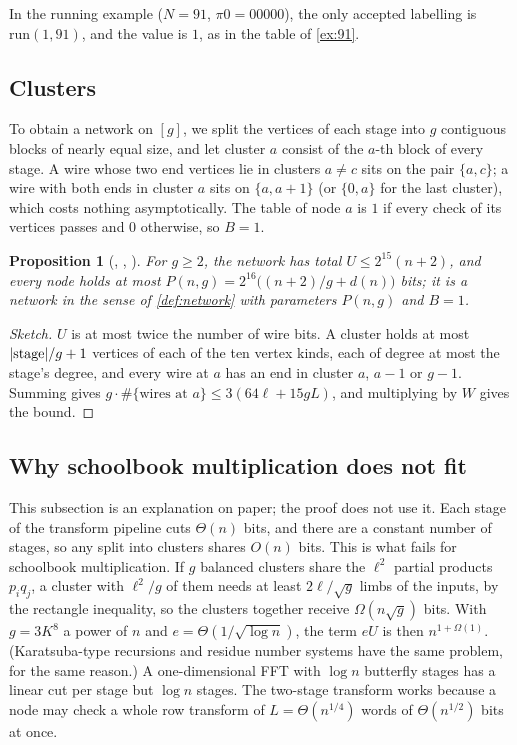 \documentclass[10pt]{amsart}
\theoremstyle{plain}
\newtheorem{proposition}[theorem]{Proposition}
\theoremstyle{definition}
\theoremstyle{remark}
\numberwithin{equation}{section}
\begin{document}
\noindent In the running example ($N=91$, $\pi0=00000$), the only accepted labelling is
$\mathrm{run}(1,91)$, and the value is $1$, as in the table of \cref{ex:91}.

\subsection{Clusters}
To obtain a network on $[g]$, we split the vertices of each stage into $g$ contiguous blocks of nearly
equal size, and let cluster $a$ consist of the $a$-th block of every stage. A wire whose two end
vertices lie in clusters $a\ne c$ sits on the pair $\{a,c\}$; a wire with both ends in cluster $a$ sits
on $\{a,a+1\}$ (or $\{0,a\}$ for the last cluster), which costs nothing asymptotically. The table of node $a$ is $1$ if
every check of its vertices passes and $0$ otherwise, so $B=1$.

\begin{proposition}[, , ]\label{prop:params}
For $g\ge2$, the network has total $U\le2^{15}(n+2)$, and every node holds at most
$P(n,g)=2^{16}\bigl((n+2)/g+d(n)\bigr)$ bits; it is a network in the sense of \cref{def:network} with
parameters $P(n,g)$ and $B=1$.
\end{proposition}

\begin{proof}[Sketch]
$U$ is at most twice the number of wire bits. A cluster holds at most $|{\rm stage}|/g+1$ vertices of each
of the ten vertex kinds, each of degree at most the stage's degree, and every wire at $a$ has an end in
cluster $a$, $a-1$ or $g-1$. Summing gives $g\cdot\#\{\text{wires at }a\}\le3(64\ell+15gL)$, and
multiplying by $W$ gives the bound.
\end{proof}

\subsection{Why schoolbook multiplication does not fit}\label{sec:why-fft}
This subsection is an explanation on paper; the proof does not use it.
Each stage of the transform pipeline cuts $\Theta(n)$ bits, and there are a constant number of
stages, so any split into clusters shares $O(n)$ bits. This is what fails for schoolbook
multiplication. If $g$ balanced clusters share the $\ell^2$ partial products $p_iq_j$, a cluster with
$\ell^2/g$ of them needs at least $2\ell/\sqrt g$ limbs of the inputs, by the rectangle inequality, so
the clusters together receive $\Omega(n\sqrt g)$ bits. With $g=3K^8$ a power of $n$ and
$e=\Theta(1/\sqrt{\log n})$, the term $eU$ is then $n^{1+\Omega(1)}$. (Karatsuba-type recursions and
residue number systems have the same problem, for the same reason.) A one-dimensional FFT with
$\log n$ butterfly stages has a linear cut per stage but $\log n$ stages. The two-stage transform
works because a node may check a whole row transform of $L=\Theta(n^{1/4})$ words of
$\Theta(n^{1/2})$ bits at once.
\end{document}
